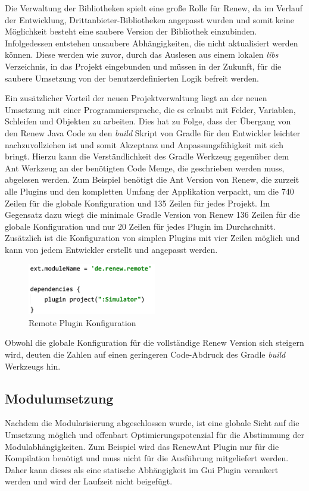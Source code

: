 	Die Verwaltung der Bibliotheken spielt eine große Rolle für Renew, da im Verlauf der Entwicklung, Drittanbieter-Bibliotheken angepasst wurden und somit keine Möglichkeit besteht eine saubere Version der Bibliothek einzubinden. Infolgedessen entstehen  unsaubere Abhängigkeiten, die nicht aktualisiert werden können. Diese werden wie zuvor, durch das Auslesen aus einem lokalen \textit{libs} Verzeichnis, in das Projekt eingebunden und müssen in der Zukunft, für die saubere Umsetzung von der benutzerdefinierten Logik befreit werden.\bigbreak

	Ein zusätzlicher Vorteil der neuen Projektverwaltung liegt an der neuen Umsetzung mit einer Programmiersprache, die es erlaubt mit Felder, Variablen, Schleifen und Objekten zu arbeiten. Dies hat zu Folge, dass der Übergang von den Renew Java Code zu den \textit{build} Skript von Gradle für den Entwickler leichter nachzuvollziehen ist und somit Akzeptanz und Anpassungsfähigkeit mit sich bringt. \newline
	Hierzu kann die Verständlichkeit des Gradle Werkzeug gegenüber dem Ant Werkzeug an der benötigten Code Menge, die geschrieben werden muss, abgelesen werden. Zum Beispiel benötigt die Ant Version von Renew, die zurzeit alle Plugins und den kompletten Umfang der Applikation verpackt, um die 740 Zeilen für die globale Konfiguration und 135 Zeilen für jedes Projekt. Im Gegensatz dazu wiegt die minimale Gradle Version von Renew 136 Zeilen für die globale Konfiguration und nur 20 Zeilen für jedes Plugin im Durchschnitt. Zusätzlich ist die Konfiguration von simplen Plugins mit vier Zeilen möglich und kann von jedem Entwickler erstellt und angepasst werden.

	\begin{figure}[h!]
	  \centering
	  \includegraphics[width=0.5\textwidth]{material/images/Remote_config.png}
	  \caption{Remote Plugin Konfiguration}
	  \label{fig:remote_config}
	\end{figure}	

	Obwohl die globale Konfiguration für die vollständige Renew Version sich steigern wird, deuten die Zahlen auf einen geringeren Code-Abdruck des Gradle \textit{build} Werkzeugs hin.\bigbreak

\subsection{Modulumsetzung} \label{sub:optimierung}%
	Nachdem die Modularisierung abgeschlossen wurde, ist eine globale Sicht auf die Umsetzung möglich und offenbart Optimierungspotenzial für die Abstimmung der Modulabhängigkeiten. Zum Beispiel wird das RenewAnt Plugin nur für die Kompilation benötigt und muss nicht für die Ausführung mitgeliefert werden. Daher kann dieses als eine statische Abhängigkeit im Gui Plugin verankert werden und wird der Laufzeit nicht beigefügt.\bigbreak

